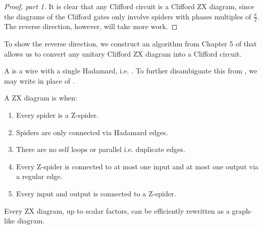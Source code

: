 \begin{proof}[Proof, part 1]
It is clear that any Clifford circuit is a Clifford ZX diagram, since the diagrams of the Clifford gates only involve spiders with phases multiples of $\tfrac{\pi}{2}$. The reverse direction, however, will take more work.
\end{proof}

To show the reverse direction, we construct an algorithm from Chapter 5 of \cite{PQS} that allows us to convert any unitary Clifford ZX diagram into a Clifford circuit.

\begin{definition}
A  is a wire with a single Hadamard, i.e. \zx{\rar & \zxH{} \rar &}. To further disambiguate this from \zx{\rar & \zxZ{} \rar &}, we may write \zx{\ar[r,hw] & \ar[r,hw] &} in place of \zx{\rar & \zxH{} \rar &}.
\end{definition}

\begin{definition}
A ZX diagram is  when:
\begin{enumerate}[label=(\alph*)]
    \item Every spider is a Z-spider.
    \item Spiders are only connected via Hadamard edges.
    \item There are no self loops or parallel i.e. duplicate edges.
    \item Every Z-spider is connected to at most one input and at most one output via a regular edge.
    \item Every input and output is connected to a Z-spider.
\end{enumerate}
\end{definition}

\begin{theorem}
\label{thm:zx-to-graph-like}
Every ZX diagram, up to scalar factors, can be efficiently rewritten as a graph-like diagram.
\end{theorem}


